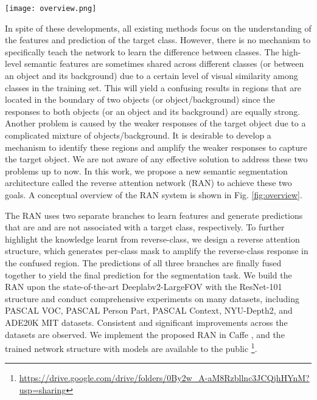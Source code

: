 \documentclass[runningheads]{llncs}
\begin{document}
\begin{figure*}
\begin{center}
\texttt{[image: overview.png]}
\end{center}
\caption{An illustration of the proposed reversed attention network (RAN),
where the lower and upper branches learn features and predictions that
are and are not associated with a target class, respectively.  The
mid-branch focuses on local regions with complicated spatial patterns
whose object responses are weaker and provide a mechanism to amplify
the response. The predictions of all three branches are fused to yield
the final prediction for the segmentation task.} \label{fig:overview}
\end{figure*}






In spite of these developments, all existing methods focus on the
understanding of the features and prediction of the target class.
However, there is no mechanism to specifically teach the network to learn the
difference between classes. The high-level semantic features are
sometimes shared across different classes (or between an object and its
background) due to a certain level of visual similarity among classes in
the training set.  This will yield a confusing results in regions that
are located in the boundary of two objects (or object/background) since
the responses to both objects (or an object and its background) are
equally strong. Another problem is caused by the weaker responses of the
target object due to a complicated mixture of objects/background. It is
desirable to develop a mechanism to identify these regions and amplify
the weaker responses to capture the target object. We are not aware of
any effective solution to address these two problems up to now. In this
work, we propose a new semantic segmentation architecture called the reverse attention
network (RAN) to achieve these two goals. A conceptual overview of the
RAN system is shown in Fig. \ref{fig:overview}. 

The RAN uses two separate branches to learn features and generate predictions
that are and are not associated with a target class, respectively. To further highlight the knowledge learnt from reverse-class, we design a reverse attention structure, which generates per-class mask to amplify the reverse-class response in the confused region. The predictions of all three branches are finally
fused together to yield the final prediction for the segmentation task.
We build the RAN upon the state-of-the-art Deeplabv2-LargeFOV with the
ResNet-101 structure and conduct comprehensive experiments on many datasets, including
PASCAL VOC, PASCAL Person Part, PASCAL Context, NYU-Depth2, and ADE20K
MIT datasets.  Consistent and significant improvements across the
datasets are observed. We implement the proposed RAN in Caffe \cite{jia2014caffe}, and the trained network structure with models are
available to the public 
\footnote{\url{https://drive.google.com/drive/folders/0By2w_A-aM8Rzbllnc3JCQjhHYnM?usp=sharing}}. 
\end{document}

